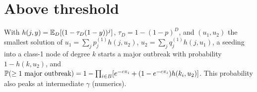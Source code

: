 \section{Above threshold}\label{sec:threshold}
With $h(j,y)=\mathbb{E}_D[(1-\tau_D(1-y))^j]$, $\tau_D=1-(1-p)^D$, and $(u_1,u_2)$ the smallest
solution of $u_1=\sum_jp^{(1)}_jh(j,u_2)$, $u_2=\sum_jq^{(1)}_jh(j,u_1)$, a seeding into a class-1
node of degree $k$ starts a major outbreak with probability $1-h(k,u_2)$, and
$\mathbb{P}(\ge1\text{ major outbreak})=1-\prod_{i\in B}[e^{-c\pi_i}+(1-e^{-c\pi_i})h(k_i,u_2)]$. This
probability also peaks at intermediate $\gamma$ (numerics).

